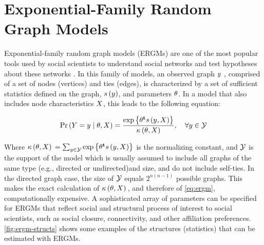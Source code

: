 \documentclass[12pt]{article}
\begin{document}
\section{Exponential-Family Random Graph Models}

Exponential-family random graph models (ERGMs) are one of the most popular tools used by social scientists to understand social networks and test hypotheses about these networks  \cite[and others]{Robins2007,Holland1981,Frank1986,Wasserman1996,Snijders2006}. In this family of models, an observed graph $y$ , comprised of a set of nodes (vertices) and ties (edges), is characterized by a set of sufficient statistics defined on the graph, $s\left(y\right)$, and parameters $\theta$. In a model that also includes node characteristics $X$, this leads to the following equation:

\begin{equation}
\label{eq:ergm}
  \Prcond{\Adjmat = \adjmat}{\params, \Indepvar} = \frac{%
  	\exp{\transpose{\params}\sufstats{\adjmat, \Indepvar}}%
  }{
  	\kappa\left(\params, \Indepvar\right)
  },\quad\forall \adjmat\in\ADJMAT
\end{equation}

\noindent Where $\kappa\left(\theta, X\right){} = \sum_{y\in\mathcal{Y}}\mbox{exp}\left\{{\theta}^\mathbf{t}s\left(y, X\right)\right\}$ is the normalizing constant, and $\mathcal{Y}$ is the support of the model which is usually assumed to include all graphs of the same type (e.g., directed or undirected)and size, and do not include self-ties. In the directed graph case, the size of $\mathcal{Y}$ equals $2^{n(n-1)}$ possible graphs. This makes the exact calculation of $\kappa\left(\theta, X\right){}$, and therefore of \eqref{eq:ergm},  computationally expensive. A sophisticated array of parameters can be specified for ERGMs that reflect social and structural process of interest to social scientists, such as social closure, connectivity, and other affiliation preferences.  \autoref{fig:ergm-structs} shows some examples of the structures (statistics) that can be estimated with ERGMs.
\end{document}
